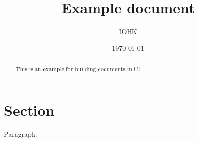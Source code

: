 \documentclass{article}
\title{Example document}
\author{IOHK}
\date{\today}
\begin{document}
\maketitle


\begin{abstract}
This is an example for building documents in CI.
\end{abstract}

\section{Section}

Paragraph.
\end{document}
